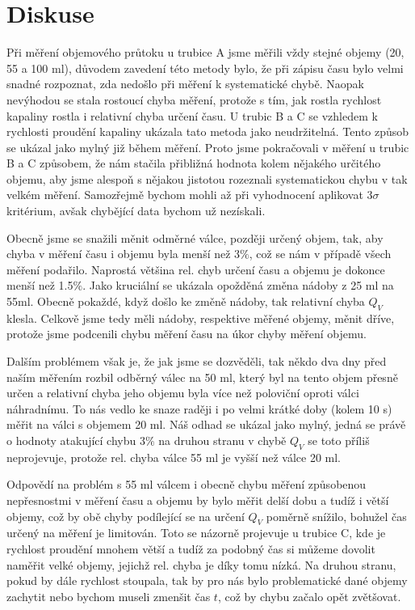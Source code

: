 \documentclass[a4paper]{article}
\begin{document}
\section*{Diskuse}
\par Při měření objemového průtoku u trubice A jsme měřili vždy stejné objemy (20, 55 a 100 ml), důvodem zavedení této metody bylo, že při zápisu času bylo velmi snadné rozpoznat, zda nedošlo při měření k systematické chybě. Naopak nevýhodou se stala rostoucí chyba měření, protože s tím, jak rostla rychlost kapaliny rostla i relativní chyba určení času. U trubic B a C se vzhledem k rychlosti proudění kapaliny ukázala tato metoda jako neudržitelná. Tento způsob se ukázal jako mylný již během měření. Proto jsme pokračovali v měření u trubic B a C způsobem, že nám stačila přibližná hodnota kolem nějakého určitého objemu, aby jsme alespoň s nějakou jistotou rozeznali systematickou chybu v tak velkém měření. Samozřejmě bychom mohli až při vyhodnocení aplikovat $3 \sigma$ kritérium, avšak chybějící data bychom už nezískali.
\par Obecně jsme se snažili měnit odměrné válce, později určený objem, tak, aby chyba v měření času i objemu byla menší než 3$\%$, což se nám v případě všech měření podařilo. Naprostá většina rel. chyb určení času a objemu je dokonce menší než 1.5$\%$. Jako kruciální se ukázala opožděná změna nádoby z 25 ml na 55ml. Obecně pokaždé, když došlo ke změně nádoby, tak relativní chyba $Q_{V}$ klesla. Celkově jsme tedy měli nádoby, respektive měřené objemy, měnit dříve, protože jsme podcenili chybu měření času na úkor chyby měření objemu.
\par Dalším problémem však je, že jak jsme se dozvěděli, tak někdo dva dny před naším měřením rozbil odběrný válec na 50 ml, který byl na tento objem přesně určen a relativní chyba jeho objemu byla více než poloviční oproti válci náhradnímu. To nás vedlo ke snaze raději i po velmi krátké doby (kolem 10 s) měřit na válci s objemem 20 ml. Náš odhad se ukázal jako mylný, jedná se právě o hodnoty atakující chybu 3$\%$ na druhou stranu v chybě $Q_{V}$ se toto příliš neprojevuje, protože rel. chyba válce 55 ml je vyšší než válce 20 ml.
\par Odpovědí na problém s 55 ml válcem i obecně chybu měření způsobenou nepřesnostmi v měření času a objemu by bylo měřit delší dobu a tudíž i větší objemy, což by obě chyby podílející se na určení $Q_{V}$ poměrně snížilo, bohužel čas určený na měření je limitován. Toto se názorně projevuje u trubice C, kde je rychlost proudění mnohem větší a tudíž za podobný čas si můžeme dovolit naměřit velké objemy, jejichž rel. chyba je díky tomu nízká. Na druhou stranu, pokud by dále rychlost stoupala, tak by pro nás bylo problematické dané objemy zachytit nebo bychom museli zmenšit čas $t$, což by chybu začalo opět zvětšovat.
\end{document}
